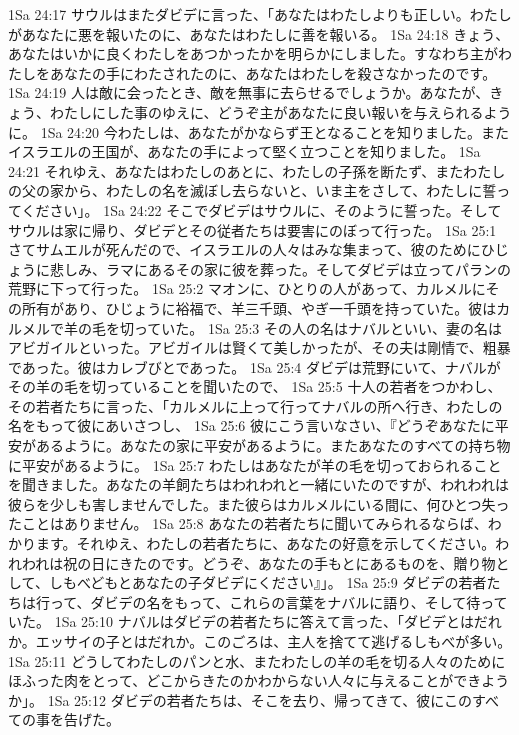 1Sa 24:17  サウルはまたダビデに言った、「あなたはわたしよりも正しい。わたしがあなたに悪を報いたのに、あなたはわたしに善を報いる。
1Sa 24:18  きょう、あなたはいかに良くわたしをあつかったかを明らかにしました。すなわち主がわたしをあなたの手にわたされたのに、あなたはわたしを殺さなかったのです。
1Sa 24:19  人は敵に会ったとき、敵を無事に去らせるでしょうか。あなたが、きょう、わたしにした事のゆえに、どうぞ主があなたに良い報いを与えられるように。
1Sa 24:20  今わたしは、あなたがかならず王となることを知りました。またイスラエルの王国が、あなたの手によって堅く立つことを知りました。
1Sa 24:21  それゆえ、あなたはわたしのあとに、わたしの子孫を断たず、またわたしの父の家から、わたしの名を滅ぼし去らないと、いま主をさして、わたしに誓ってください」。
1Sa 24:22  そこでダビデはサウルに、そのように誓った。そしてサウルは家に帰り、ダビデとその従者たちは要害にのぼって行った。
1Sa 25:1  さてサムエルが死んだので、イスラエルの人々はみな集まって、彼のためにひじょうに悲しみ、ラマにあるその家に彼を葬った。そしてダビデは立ってパランの荒野に下って行った。
1Sa 25:2  マオンに、ひとりの人があって、カルメルにその所有があり、ひじょうに裕福で、羊三千頭、やぎ一千頭を持っていた。彼はカルメルで羊の毛を切っていた。
1Sa 25:3  その人の名はナバルといい、妻の名はアビガイルといった。アビガイルは賢くて美しかったが、その夫は剛情で、粗暴であった。彼はカレブびとであった。
1Sa 25:4  ダビデは荒野にいて、ナバルがその羊の毛を切っていることを聞いたので、
1Sa 25:5  十人の若者をつかわし、その若者たちに言った、「カルメルに上って行ってナバルの所へ行き、わたしの名をもって彼にあいさつし、
1Sa 25:6  彼にこう言いなさい、『どうぞあなたに平安があるように。あなたの家に平安があるように。またあなたのすべての持ち物に平安があるように。
1Sa 25:7  わたしはあなたが羊の毛を切っておられることを聞きました。あなたの羊飼たちはわれわれと一緒にいたのですが、われわれは彼らを少しも害しませんでした。また彼らはカルメルにいる間に、何ひとつ失ったことはありません。
1Sa 25:8  あなたの若者たちに聞いてみられるならば、わかります。それゆえ、わたしの若者たちに、あなたの好意を示してください。われわれは祝の日にきたのです。どうぞ、あなたの手もとにあるものを、贈り物として、しもべどもとあなたの子ダビデにください』」。
1Sa 25:9  ダビデの若者たちは行って、ダビデの名をもって、これらの言葉をナバルに語り、そして待っていた。
1Sa 25:10  ナバルはダビデの若者たちに答えて言った、「ダビデとはだれか。エッサイの子とはだれか。このごろは、主人を捨てて逃げるしもべが多い。
1Sa 25:11  どうしてわたしのパンと水、またわたしの羊の毛を切る人々のためにほふった肉をとって、どこからきたのかわからない人々に与えることができようか」。
1Sa 25:12  ダビデの若者たちは、そこを去り、帰ってきて、彼にこのすべての事を告げた。
